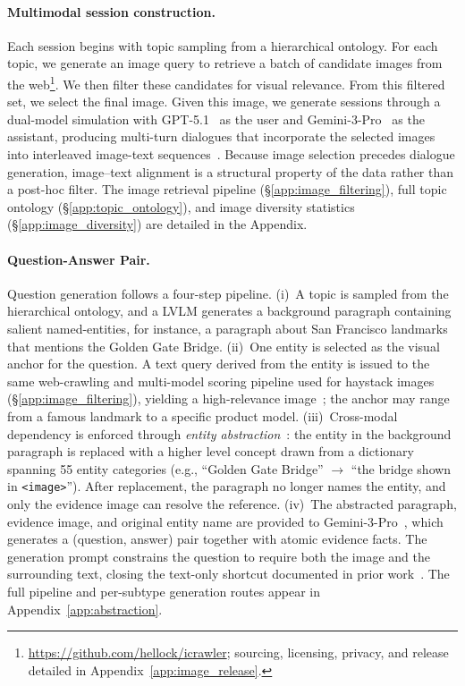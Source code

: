 \documentclass{article}
\begin{document}
\paragraph{Multimodal session construction.}
Each session begins with topic sampling from a hierarchical ontology. For each topic, we generate an image query to retrieve a batch of candidate images from the web\footnote{\url{https://github.com/hellock/icrawler}; sourcing, licensing, privacy, and release detailed in Appendix~\ref{app:image_release}.}. We then filter these candidates for visual relevance. From this filtered set, we select the final image. Given this image, we generate sessions through a dual-model simulation with GPT-5.1~\citep{singh2025openaigpt5card} as the user and Gemini-3-Pro~\citep{googledeepmind2026gemini3procard} as the assistant, producing multi-turn dialogues that incorporate the selected images into interleaved image-text sequences~\cite{laurenccon2023obelics}. Because image selection precedes dialogue generation, image--text alignment is a structural property of the data rather than a post-hoc filter. The image retrieval pipeline (\S\ref{app:image_filtering}), full topic ontology (\S\ref{app:topic_ontology}), and image diversity statistics (\S\ref{app:image_diversity}) are detailed in the Appendix.

\paragraph{Question-Answer Pair.}
Question generation follows a four-step pipeline. (i)~A topic is sampled from the hierarchical ontology, and a LVLM generates a background paragraph containing salient named-entities, for instance, a paragraph about San Francisco landmarks that mentions the Golden Gate Bridge. (ii)~One entity is selected as the visual anchor for the question. A text query derived from the entity is issued to the same web-crawling and multi-model scoring pipeline used for haystack images (\S\ref{app:image_filtering}), yielding a high-relevance image~\cite{hu2023open}; the anchor may range from a famous landmark to a specific product model. (iii)~Cross-modal dependency is enforced through \emph{entity abstraction}~\cite{wang2024abspyramid,wang2024absinstruct,viquae}: the entity in the background paragraph is replaced with a higher level concept drawn from a dictionary spanning 55 entity categories (e.g., ``Golden Gate Bridge'' $\to$ ``the bridge shown in \texttt{<image>}''). After replacement, the paragraph no longer names the entity, and only the evidence image can resolve the reference. (iv)~The abstracted paragraph, evidence image, and original entity name are provided to Gemini-3-Pro~\citep{googledeepmind2026gemini3procard}, which generates a (question, answer) pair together with atomic evidence facts. The generation prompt constrains the question to require both the image and the surrounding text, closing the text-only shortcut documented in prior work~\cite{maharana2024evaluatinglongtermconversationalmemory}. The full pipeline and per-subtype generation routes appear in Appendix~\ref{app:abstraction}.
\end{document}
